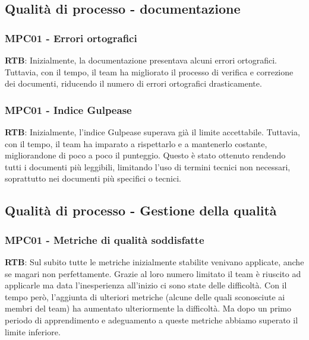 \documentclass[10pt]{article}
\begin{document}
\begin{justify}
\subsection{Qualità di processo - documentazione}
\subsubsection{MPC01 - Errori ortografici}
\textbf{RTB}: Inizialmente, la documentazione presentava alcuni errori ortografici. Tuttavia, con il tempo, il team ha migliorato il processo di verifica e correzione 
dei documenti, riducendo il numero di errori ortografici drasticamente.
\subsubsection{MPC01 - Indice Gulpease}
\textbf{RTB}: Inizialmente, l'indice Gulpease superava già il limite accettabile. Tuttavia, con il tempo, il team ha imparato a rispettarlo e a mantenerlo costante, 
migliorandone di poco a poco il punteggio. Questo è stato ottenuto rendendo tutti i documenti più leggibili, limitando l'uso di termini tecnici non necessari, 
soprattutto nei documenti più specifici o tecnici.


\subsection{Qualità di processo - Gestione della qualità}
\subsubsection{MPC01 - Metriche di qualità soddisfatte}
\textbf{RTB}: Sul subito tutte le metriche inizialmente stabilite venivano applicate, anche se magari non perfettamente. Grazie al loro numero limitato il team è 
riuscito ad applicarle ma data l'inesperienza all'inizio ci sono state delle difficoltà. Con il tempo però, l'aggiunta di ulteriori metriche (alcune delle quali 
sconosciute ai membri del team) ha aumentato ulteriormente la difficoltà. Ma dopo un primo periodo di apprendimento e adeguamento a queste metriche abbiamo superato 
il limite inferiore.



\end{justify}
\end{document}
